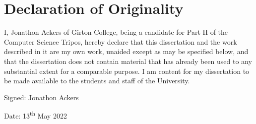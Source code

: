 \pagestyle{plain}

\chapter*{Declaration of Originality}

\indent \indent
I, Jonathon Ackers of Girton College, being a candidate for Part II of the Computer Science Tripos, hereby declare that this dissertation and the work described in it are my own work, unaided except as may be specified below, and that the dissertation does not contain material that has already been used to any substantial extent for a comparable purpose. I am content for my dissertation to be made available to the students and staff of the University.

\bigskip \bigskip

Signed: Jonathon Ackers

\bigskip \bigskip

Date: 13\textsuperscript{th} May 2022
